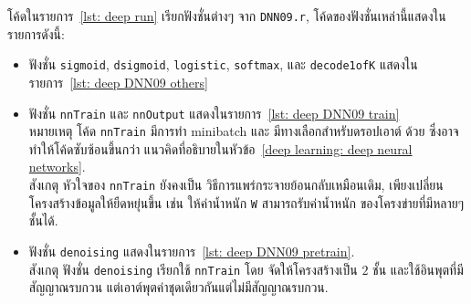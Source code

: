 โค้ดในรายการ~\ref{lst: deep run} เรียกฟังชั่นต่างๆ จาก \verb|DNN09.r|,
โค้ดของฟังชั่นเหล่านี้แสดงในรายการดังนี้:
\begin{itemize}
\item  ฟังชั่น \verb|sigmoid|, \verb|dsigmoid|, \verb|logistic|, \verb|softmax|, และ \verb|decode1ofK| แสดงในรายการ~\ref{lst: deep DNN09 others}
\item ฟังชั่น \verb|nnTrain| และ \verb|nnOutput| แสดงในรายการ~\ref{lst: deep DNN09 train}
\\หมายเหตุ โค้ด \verb|nnTrain| มีการทำ minibatch และ มีทางเลือกสำหรับดรอปเอาต์ ด้วย ซึ่งอาจทำให้โค้ดซับซ้อนขึ้นกว่า แนวคิดที่อธิบายในหัวข้อ~\ref{deep learning: deep neural networks}.
\\สังเกตุ หัวใจของ \verb|nnTrain| ยังคงเป็น วิธีการแพร่กระจายย้อนกลับเหมือนเดิม,
เพียงเปลี่ยนโครงสร้างข้อมูลให้ยืดหยุ่นขึ้น เช่น ให้ค่าน้ำหนัก \verb|W| สามารถรับค่าน้ำหนัก ของโครงข่ายที่มีหลายๆชั้นได้. %
\item ฟังชั่น \verb|denoising| แสดงในรายการ~\ref{lst: deep DNN09 pretrain}.
\\สังเกตุ ฟังชั่น \verb|denoising| เรียกใช้ \verb|nnTrain| โดย จัดให้โครงสร้างเป็น $2$ ชั้น และใช้อินพุตที่มีสัญญาณรบกวน แต่เอาต์พุตค่าชุดเดียวกันแต่ไม่มีสัญญาณรบกวน.

\end{itemize}

%

